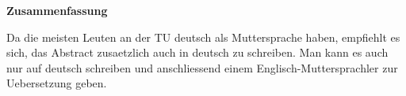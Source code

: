 \thispagestyle{empty}
\vspace*{0.2cm}

\begin{center}
    \textbf{Zusammenfassung}
\end{center}

\vspace*{0.2cm}

\noindent 
Da die meisten Leuten an der TU deutsch als Muttersprache haben, empfiehlt es sich, das Abstract zusaetzlich auch in deutsch zu schreiben. Man kann es auch nur auf deutsch schreiben und anschliessend einem Englisch-Muttersprachler zur Uebersetzung geben.